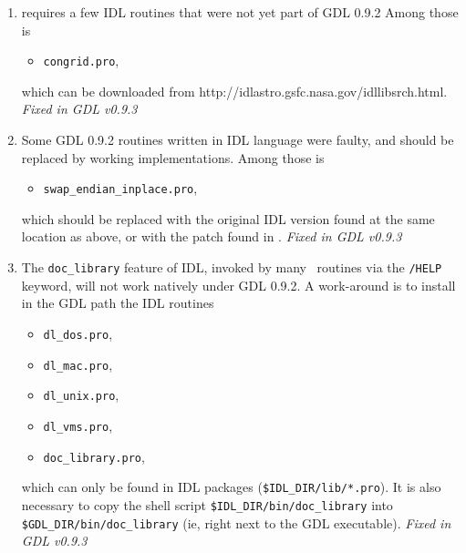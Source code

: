 \documentclass[12pt,twoside]{article}
\begin{document}
\begin{enumerate}
\item
\healpix requires a few IDL routines that were not yet part of GDL 0.9.2
Among those is
\begin{itemize}
\item {\tt congrid.pro},
\end{itemize}
which can be downloaded from
{http://idlastro.gsfc.nasa.gov/idllibsrch.html}. {\em Fixed in GDL v0.9.3}

\item
Some GDL 0.9.2 routines written in IDL language were faulty, and should be replaced by working implementations.
Among those is
\begin{itemize}
\item {\tt swap\_endian\_inplace.pro},
\end{itemize}
which should be replaced with the original IDL version found at the same
location as above, or with the patch found in .
{\em Fixed in GDL v0.9.3}

\item
The {\tt doc\_library} feature of IDL, invoked by many \healpix\ routines via
the {\tt /HELP} keyword, will not work natively under GDL 0.9.2. A work-around is to install in the GDL path the IDL routines
\begin{itemize}
\item {\tt dl\_dos.pro},
\item {\tt dl\_mac.pro},
\item {\tt dl\_unix.pro},
\item {\tt dl\_vms.pro},
\item {\tt doc\_library.pro},
\end{itemize}
which can only be found in IDL packages
({\tt \$IDL\_DIR/lib/*.pro}). 
It is also necessary to copy the shell script {\tt \$IDL\_DIR/bin/doc\_library}
into {\tt \$GDL\_DIR/bin/doc\_library} (ie, right next to the GDL executable). {\em Fixed in GDL v0.9.3}
\end{enumerate}
\end{document}
